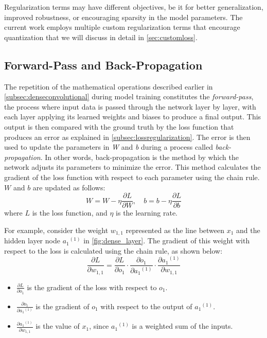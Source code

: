 Regularization terms may have different objectives, be it for better generalization, 
improved robustness, or encouraging sparsity in the model parameters. 
The current work employs multiple custom regularization terms 
that encourage quantization that we will discuss in detail in \cref{sec:customloss}.


\subsection{Forward-Pass and Back-Propagation}
\label{subsec:forwardback}
\hspace*{1em} The repetition of the mathematical operations described earlier in \cref{subsec:denseconvolutional} 
during model training constitutes the \textit{forward-pass}, 
the process where input data is passed through the network layer by layer, 
with each layer applying its learned weights and biases to produce a final output. 
This output is then compared with the ground truth by the loss function that produces an error
as explained in \cref{subsec:lossregularization}.
The error is then used to update the parameters in \textit{W} and \textit{b} during a process called \textit{back-propagation}.
In other words, back-propagation is the method by which the network adjusts its parameters to minimize the error. 
This method calculates the gradient of the loss function with respect to each parameter using the chain rule. 
\( W \) and \( b \) are updated as follows:
\[
W = W - \eta \frac{\partial L}{\partial W}, \quad b = b - \eta \frac{\partial L}{\partial b}
\]
where \( L \) is the loss function, and \( \eta \) is the learning rate.

For example, consider the weight \( w_{1,1} \) represented as the line between \( x_1 \)
 and the hidden layer node \( {a_1}^{(1)} \) in \cref{fig:dense_layer}. 
The gradient of this weight with respect to the loss is calculated using the chain rule,
as shown below:
\[
\frac{\partial L}{\partial w_{1,1}} = \frac{\partial L}{\partial o_1} \cdot \frac{\partial o_1}{\partial {a_1}^{(1)}} \cdot \frac{\partial {a_1}^{(1)}}{\partial w_{1,1}}
\]
\begin{itemize}
    \item \( \frac{\partial L}{\partial o_1} \) is the gradient of the loss with respect to \( o_1 \).
    \item \( \frac{\partial o_1}{\partial {a_1}^{(1)}} \) is the gradient of \( o_1 \) with respect to the output of \( {a_1}^{(1)} \).
    \item \( \frac{\partial {a_1}^{(1)} }{\partial w_{1,1}} \) is the value of  \( x_1 \), since  \( {a_1}^{(1)} \) is a weighted sum of the inputs.
\end{itemize}

